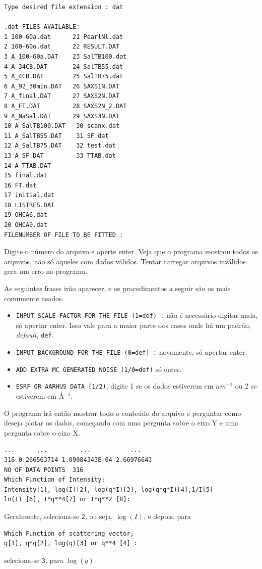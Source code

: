 \begin{apendicesenv}
\begin{verbatim}
Type desired file extension : dat

.dat FILES AVAILABLE:
1 100-60a.dat      21 PearlNl.dat
2 100-60o.dat      22 RESULT.DAT
3 A_100-60a.DAT    23 SalTB100.dat
4 A_34CB.DAT       24 SalTB55.dat
5 A_4CB.DAT        25 SalTB75.dat
6 A_92_30min.DAT   26 SAXS1N.DAT
7 A_final.DAT      27 SAXS2N.DAT
8 A_FT.DAT         28 SAXS2N_2.DAT
9 A_NaSal.DAT      29 SAXS3N.DAT
10 A_SalTB100.DAT   30 scanx.dat
11 A_SalTB55.DAT    31 SF.dat
12 A_SalTB75.DAT    32 test.dat
13 A_SF.DAT         33 TTAB.dat
14 A_TTAB.DAT
15 final.dat
16 FT.dat
17 initial.dat
18 LISTRES.DAT
19 OHCA6.dat
20 OHCA9.dat
FILENUMBER OF FILE TO BE FITTED :
\end{verbatim}

Digite o número do arquivo e aperte enter. Veja que o programa mostrou todos os arquivos, não só aqueles com dados válidos. Tentar carregar arquivos inválidos gera um erro no programa.

As seguintes frases irão aparecer, e os procedimentos a seguir são os mais comumente usados.

\begin{itemize}
	\item \texttt{INPUT SCALE FACTOR FOR THE FILE (1=def) :} não é necessário digitar nada, só apertar enter. Isso vale para a maior parte dos casos onde há um padrão, \emph{default}, \texttt{def}.
	\item \texttt{INPUT BACKGROUND FOR THE FILE (0=def) :} novamente, só apertar enter.
	\item \texttt{ADD EXTRA MC GENERATED NOISE (1/0=def)} só enter.
	\item \texttt{ESRF OR AARHUS DATA (1/2)}, digite 1 se os dados estiverem em $nm^{-1}$ ou 2 se estiverem em \AA$^{-1}$.
\end{itemize}

O programa irá então mostrar todo o conteúdo do arquivo e perguntar como deseja plotar os dados, começando com uma pergunta sobre o eixo Y e uma pergunta sobre o eixo X.

\begin{verbatim}
...      ...         ...           ...
316 0.266563714 1.09084343E-04 2.66976643
NO OF DATA POINTS  316
Which Function of Intensity;
Intensity[1], log(I)[2], log(q*I)[3], log(q*q*I)[4],1/I[5]
ln(I) [6], I*q**4[7] or I*q**2 [8]:
\end{verbatim}

Geralmente, seleciona-se \texttt{2}, ou seja, $\log(I)$, e depois, para 
\begin{verbatim}Which Function of scattering vector;
q[1], q*q[2], log(q)[3] or q**4 [4] :\end{verbatim} seleciona-se \texttt{3}, para $\log(q)$.


\end{apendicesenv}
